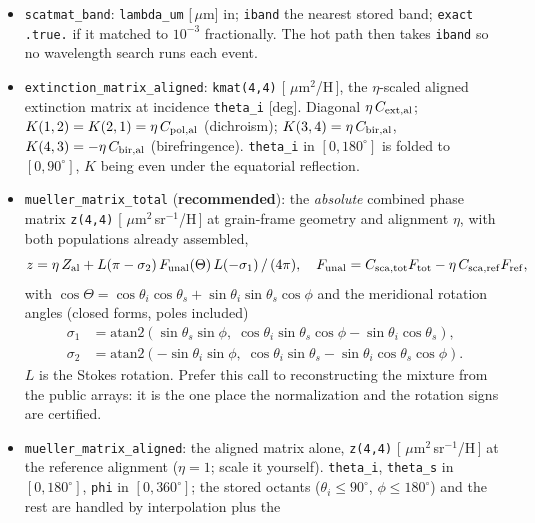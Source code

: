 \documentclass{my_memo}
\newcommand{\code}[1]{\texttt{#1}}
\newcommand{\um}{\ensuremath{\,\mu\mathrm{m}}}
\begin{document}
\begin{itemize}
\item \code{scatmat\_band}: \code{lambda\_um} [\um] in; \code{iband} the nearest
      stored band; \code{exact} \code{.true.} if it matched to $10^{-3}$
      fractionally. The hot path then takes \code{iband} so no wavelength search
      runs each event.
\item \code{extinction\_matrix\_aligned}: \code{kmat(4,4)} [\,\um$^2$/H\,], the
      $\eta$-scaled aligned extinction matrix at incidence \code{theta\_i} [deg].
      Diagonal $\eta\,C_{\rm ext,al}$; $K(1,2)=K(2,1)=\eta\,C_{\rm pol,al}$
      (dichroism); $K(3,4)=\eta\,C_{\rm bir,al}$, $K(4,3)=-\eta\,C_{\rm bir,al}$
      (birefringence). \code{theta\_i} in $[0,180^\circ]$ is folded to
      $[0,90^\circ]$, $K$ being even under the equatorial reflection.
\item \code{mueller\_matrix\_total} (\textbf{recommended}): the \emph{absolute}
      combined phase matrix \code{z(4,4)} [\,\um$^2$\,sr$^{-1}$/H\,] at
      grain-frame geometry and alignment $\eta$, with both populations already
      assembled,
      \[
        z = \eta\,Z_{\rm al}
          + L(\pi-\sigma_2)\,F_{\rm unal}(\Theta)\,L(-\sigma_1)\,/\,(4\pi),
        \quad
        F_{\rm unal}=C_{\rm sca,tot}F_{\rm tot}-\eta\,C_{\rm sca,ref}F_{\rm ref},
      \]
      with $\cos\Theta=\cos\theta_i\cos\theta_s+\sin\theta_i\sin\theta_s\cos\phi$
      and the meridional rotation angles (closed forms, poles included)
      \begin{align*}
        \sigma_1 &= \mathrm{atan2}\!\left(\sin\theta_s\sin\phi,\;
                    \cos\theta_i\sin\theta_s\cos\phi-\sin\theta_i\cos\theta_s\right),\\
        \sigma_2 &= \mathrm{atan2}\!\left(-\sin\theta_i\sin\phi,\;
                    \cos\theta_i\sin\theta_s-\sin\theta_i\cos\theta_s\cos\phi\right).
      \end{align*}
      $L$ is the Stokes rotation. Prefer this call to reconstructing the mixture
      from the public arrays: it is the one place the normalization and the
      rotation signs are certified.
\item \code{mueller\_matrix\_aligned}: the aligned matrix alone, \code{z(4,4)}
      [\,\um$^2$\,sr$^{-1}$/H\,] at the reference alignment ($\eta=1$; scale it
      yourself). \code{theta\_i}, \code{theta\_s} in $[0,180^\circ]$, \code{phi}
      in $[0,360^\circ]$; the stored octants ($\theta_i\!\le\!90^\circ$,
      $\phi\!\le\!180^\circ$) and the rest are handled by interpolation plus the

\end{itemize}
\end{document}
